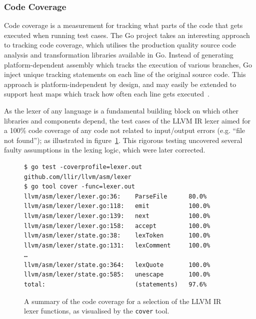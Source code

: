 
\subsubsection{Code Coverage}
\label{sec:ver_code_coverage}

Code coverage is a measurement for tracking what parts of the code that gets executed when running test cases. The Go project takes an interesting approach to tracking code coverage, which utilises the production quality source code analysis and transformation libraries available in Go. Instead of generating platform-dependent assembly which tracks the execution of various branches, Go inject unique tracking statements on each line of the original source code. This approach is platform-independent by design, and may easily be extended to support heat maps which track how often each line gets executed~\cite{go_cover}.

As the lexer of any language is a fundamental building block on which other libraries and components depend, the test cases of the LLVM IR lexer aimed for a 100\% code coverage of any code not related to input/output errors (e.g. ``file not found''); as illustrated in figure~\ref{fig:lexer_code_coverage}. This rigorous testing uncovered several faulty assumptions in the lexing logic, which were later corrected.

\begin{figure}[htbp]
	\begin{center}
		\begin{BVerbatim}
$ go test -coverprofile=lexer.out github.com/llir/llvm/asm/lexer
$ go tool cover -func=lexer.out
llvm/asm/lexer/lexer.go:36:    ParseFile      80.0%
llvm/asm/lexer/lexer.go:118:   emit           100.0%
llvm/asm/lexer/lexer.go:139:   next           100.0%
llvm/asm/lexer/lexer.go:158:   accept         100.0%
llvm/asm/lexer/state.go:38:    lexToken       100.0%
llvm/asm/lexer/state.go:131:   lexComment     100.0%
…
llvm/asm/lexer/state.go:364:   lexQuote       100.0%
llvm/asm/lexer/state.go:585:   unescape       100.0%
total:                         (statements)   97.6%
		\end{BVerbatim}
		\caption{A summary of the code coverage for a selection of the LLVM IR lexer functions, as visualised by the \texttt{cover} tool.}
		\label{fig:lexer_code_coverage}
	\end{center}
\end{figure}

